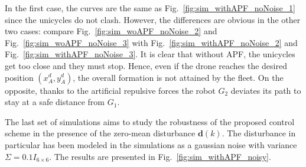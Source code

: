 \documentclass{ifacconf}
\begin{document}
In the first case, the curves are the same as Fig.~\ref{fig:sim_withAPF_noNoise_1} since 
the unicycles do not clash.
However, the differences are obvious in the other two cases: compare
Fig.~\ref{fig:sim_woAPF_noNoise_2} and Fig.~\ref{fig:sim_woAPF_noNoise_3} with
Fig.~\ref{fig:sim_withAPF_noNoise_2} and Fig.~\ref{fig:sim_withAPF_noNoise_3}.
It is clear  that without APF, the unicycles get too close and they must stop.
Hence, even if the drone reaches the desired position $(x^d_A, y^d_A)$, 
the overall formation is not attained by the fleet.
On the opposite, thanks to the artificial repulsive forces the robot $G_2$ 
deviates its path to stay at a safe distance from $G_1$.


The last set of simulations aims to study the robustness of the proposed control 
scheme in the presence of the zero-mean disturbance $\boldsymbol{d}(k)$.
The disturbance in particular has been modeled in the simulations 
as a gaussian noise with variance $\Sigma = 0.1 I_{6\times6}$.
The results are presented in Fig.~\ref{fig:sim_withAPF_noisy}.
\end{document}
